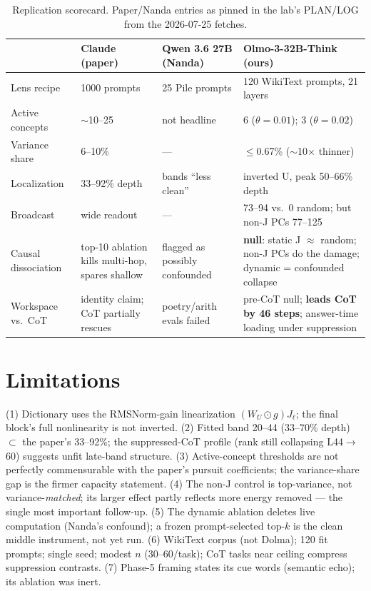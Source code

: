 \documentclass[10pt]{article}
\begin{document}
\begin{table}[htbp]
\centering\footnotesize
\begin{tabular}{p{2.9cm}p{3.6cm}p{3.2cm}p{4.6cm}}
\toprule
 & Claude (paper) & Qwen 3.6 27B (Nanda) & \textbf{Olmo-3-32B-Think (ours)} \\
\midrule
Lens recipe & 1000 prompts & 25 Pile prompts & 120 WikiText prompts, 21 layers \\
Active concepts & $\sim$10--25 & not headline & 6 ($\theta{=}0.01$); 3 ($\theta{=}0.02$) \\
Variance share & 6--10\% & --- & $\le$0.67\% ($\sim$10$\times$ thinner) \\
Localization & 33--92\% depth & bands ``less clean'' & inverted U, peak 50--66\% depth \\
Broadcast & wide readout & --- & 73--94 vs.\ 0 random; but non-J PCs 77--125 \\
Causal dissociation & top-10 ablation kills multi-hop, spares shallow & flagged as possibly confounded & \textbf{null}: static J $\approx$ random; non-J PCs do the damage; dynamic = confounded collapse \\
Workspace vs.\ CoT & identity claim; CoT partially rescues & poetry/arith evals failed & pre-CoT null; \textbf{leads CoT by 46 steps}; answer-time loading under suppression \\
\bottomrule
\end{tabular}
\caption{Replication scorecard. Paper/Nanda entries as pinned in the lab's
PLAN/LOG from the 2026-07-25 fetches.}
\end{table}

\section{Limitations}

(1) Dictionary uses the RMSNorm-gain linearization $(W_U\odot g)J_\ell$; the
final block's full nonlinearity is not inverted. (2) Fitted band 20--44
(33--70\% depth) $\subset$ the paper's 33--92\%; the suppressed-CoT profile
(rank still collapsing L44$\to$60) suggests unfit late-band structure.
(3) Active-concept thresholds are not perfectly commensurable with the
paper's pursuit coefficients; the variance-share gap is the firmer capacity
statement. (4) The non-J control is top-variance, not variance-\emph{matched};
its larger effect partly reflects more energy removed --- the single most
important follow-up. (5) The dynamic ablation deletes live computation
(Nanda's confound); a frozen prompt-selected top-$k$ is the clean middle
instrument, not yet run. (6) WikiText corpus (not Dolma); 120 fit prompts;
single seed; modest $n$ (30--60/task); CoT tasks near ceiling compress
suppression contrasts. (7) Phase-5 framing states its cue words (semantic
echo); its ablation was inert.
\end{document}
